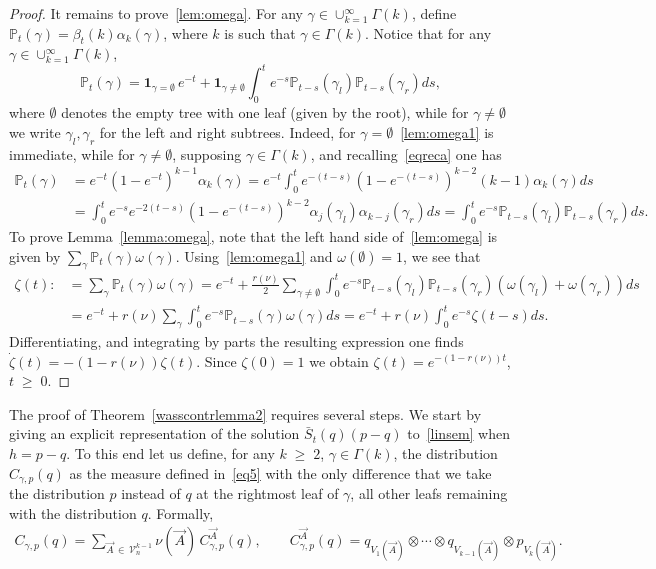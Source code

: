 \documentclass[10pt,a4paper]{article}
\renewcommand{\geq}{\;\geqslant\;}
\newcommand{\ind}{\mathbf{1}}
\newcommand{\cV}{\mathcal{V}}
\newcommand{\bbP}{\mathbb{P}}
\let\a=\alpha
\let\b=\beta
\let\g=\gamma
\let\o=\omega
\let\z=\zeta
\let\G=\Gamma
\begin{document}
\begin{proof}
It remains to prove~\eqref{lem:omega}. For any $\g\in\cup_{k=1}^\infty\G(k)$, define $\bbP_t(\g) = \b_t(k)\alpha_k(\g)$, where $k$ is such that $\g\in\G(k)$. Notice that for any $\g\in\cup_{k=1}^\infty\G(k)$,
\begin{equation}\label{lem:omega1}
\bbP_t(\g) = \ind_{\g=\emptyset}\,e^{-t} + \ind_{\g\neq \emptyset}\int_0^t e^{-s}\bbP_{t-s}(\g_l)\bbP_{t-s}(\g_r)ds,
\end{equation}
where $\emptyset$ denotes the empty tree with one leaf (given by the root), while for $\g\neq \emptyset$ we write $\g_l,\g_r$ for the left and right subtrees. Indeed, for $\g=\emptyset$~\eqref{lem:omega1} is immediate, while for $\g\neq\emptyset$, supposing $\g\in\G(k)$, and recalling~\eqref{eqreca} one has
\begin{align*}
\bbP_{t}(\g) &= e^{-t}\left(1-e^{-t}\right)^{k-1}\a_k(\g) = e^{-t}\int_0^{t}e^{-(t-s)}\left(1-e^{-(t-s)}\right)^{k-2}(k-1)\a_k(\g)ds\\ &=
\int_0^t e^{-s}e^{-2(t-s)}\left(1-e^{-(t-s)}\right)^{k-2}\a_j(\g_l)\a_{k-j}(\g_r)ds =\int_0^t e^{-s} \bbP_{t-s}(\g_l)\bbP_{t-s}(\g_r)ds.
\end{align*}
To prove Lemma~\ref{lemma:omega}, note that the left hand side of~\eqref{lem:omega} is given by $\sum_\g \bbP_t(\g)\o(\g)$. Using~\eqref{lem:omega1} and $\o(\emptyset)=1$, we see that
\begin{align*}
\z(t):&=\sum_\g\bbP_{t}(\g)\o(\g) =e^{-t} +\frac{r(\nu)}2
\sum_{\g\neq\emptyset}\int_0^t e^{-s} \bbP_{t-s}(\g_l)\bbP_{t-s}(\g_r)(\o(\g_l)+\o(\g_r))ds\\
&=e^{-t} +r(\nu)
\sum_{\g}\int_0^t e^{-s} \bbP_{t-s}(\g)\o(\g)ds=e^{-t} +r(\nu)
\int_0^t e^{-s} \z(t-s)ds.
\end{align*}
Differentiating, and integrating by parts the resulting expression one finds $\dot\z(t) = -(1-r(\nu))\z(t)$. Since $\z(0)=1$ we obtain $\z(t)=e^{-(1-r(\nu))t}$, $t\geq 0$.
\end{proof}

The proof of Theorem~\ref{wasscontrlemma2} requires several steps. We start by giving an explicit representation of the solution $\bar{S}_t(q)(p-q)$ to~\eqref{linsem} when $h=p-q$. To this end let us define, for any $k\geq 2$, $\g\in\G(k)$, the distribution $C_{\gamma, p}(q)$ as the measure defined in~\eqref{eq5} with the only difference that we take the distribution $p$ instead of $q$ at the rightmost leaf of $\g$, all other leafs remaining with the distribution $q$. Formally,
\begin{align}\label{eqab5}
C_{\gamma,p}(q)= \sum_{\vec A\,\in\,\cV_n^{k-1}}\nu(\vec A) \,C^{\vec A}_{\gamma,p}(q),\qquad C^{\vec A}_{\gamma,p}(q) = q_{V_1(\vec A)}\otimes\cdots\otimes q_{V_{k-1}(\vec A)}\otimes p_{V_{k}(\vec A)}.
\end{align}
\end{document}

